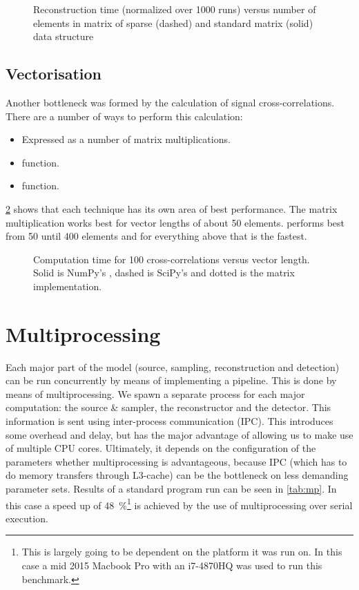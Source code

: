 \documentclass[a4paper, openany, oneside]{memoir}
\begin{document}
\begin{figure}[h]
    \centering
    
    \caption{Reconstruction time (normalized over 1000 runs) versus number of elements in matrix of sparse (dashed) and standard matrix (solid) data structure}
    \label{fig:sparse}
\end{figure}

\subsection{Vectorisation}
\label{sec:vectorisation}
Another bottleneck was formed by the calculation of signal cross-correlations. There are a number of ways to perform this calculation:
\begin{itemize}
    \item Expressed as a number of matrix multiplications.
    \item {}  function.
    \item {}  function.
\end{itemize}
\cref{fig:correlation} shows that each technique has its own area of best performance. The matrix multiplication works best for vector lengths of about 50 elements.   performs best from 50 until 400 elements and for everything above that  is the fastest.

\begin{figure}[h]
    \centering
    
    \caption{Computation time for 100 cross-correlations versus vector length. Solid is NumPy's , dashed is SciPy's  and dotted is the matrix implementation.}
    \label{fig:correlation}
\end{figure}

\section{Multiprocessing}
\label{sec:multiprocessing}

Each major part of the model (source, sampling, reconstruction and detection) can be run concurrently by means of implementing a pipeline. This is done by means of multiprocessing. We spawn a separate process for each major computation: the source \& sampler, the reconstructor and the detector. This information is sent using inter-process communication (IPC). This introduces some overhead and delay, but has the major advantage of allowing us to make use of multiple CPU cores. Ultimately, it depends on the configuration of the parameters whether multiprocessing is advantageous, because IPC (which has to do memory transfers through L3-cache) can be the bottleneck on less demanding parameter sets. Results of a standard program run can be seen in \cref{tab:mp}. In this case a speed up of \SI{48}{\percent}\footnote{This is largely going to be dependent on the platform it was run on. In this case a mid 2015 Macbook Pro with an i7-4870HQ was used to run this benchmark.} is achieved by the use of multiprocessing over serial execution.
\end{document}
